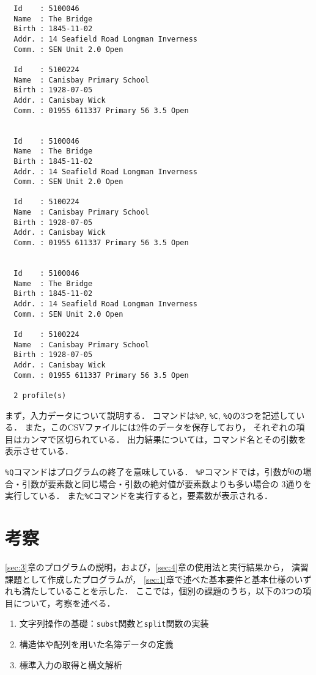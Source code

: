 \documentclass[autodetect-engine,dvi=dvipdfmx,ja=standard,
               a4j,11pt]{bxjsarticle}
\begin{document}
{\fontsize{10pt}{11pt} \selectfont
 \begin{verbatim}
  Id    : 5100046
  Name  : The Bridge
  Birth : 1845-11-02
  Addr. : 14 Seafield Road Longman Inverness
  Comm. : SEN Unit 2.0 Open

  Id    : 5100224
  Name  : Canisbay Primary School
  Birth : 1928-07-05
  Addr. : Canisbay Wick
  Comm. : 01955 611337 Primary 56 3.5 Open


  Id    : 5100046
  Name  : The Bridge
  Birth : 1845-11-02
  Addr. : 14 Seafield Road Longman Inverness
  Comm. : SEN Unit 2.0 Open

  Id    : 5100224
  Name  : Canisbay Primary School
  Birth : 1928-07-05
  Addr. : Canisbay Wick
  Comm. : 01955 611337 Primary 56 3.5 Open


  Id    : 5100046
  Name  : The Bridge
  Birth : 1845-11-02
  Addr. : 14 Seafield Road Longman Inverness
  Comm. : SEN Unit 2.0 Open

  Id    : 5100224
  Name  : Canisbay Primary School
  Birth : 1928-07-05
  Addr. : Canisbay Wick
  Comm. : 01955 611337 Primary 56 3.5 Open

  2 profile(s)
 \end{verbatim}
}

まず，入力データについて説明する．
コマンドは\verb|%P|, \verb|%C|, \verb|%Q|の3つを記述している．
また，このCSVファイルには2件のデータを保存しており，
それぞれの項目はカンマで区切られている．
出力結果については，コマンド名とその引数を表示させている．

\verb|%Q|コマンドはプログラムの終了を意味している．
\verb|%P|コマンドでは，引数が0の場合・引数が要素数と同じ場合・引数の絶対値が要素数よりも多い場合の
3通りを実行している．
また\verb|%C|コマンドを実行すると，要素数が表示される．


\section{考察} \label{sec:5}

\ref{sec:3}章のプログラムの説明，および，\ref{sec:4}章の使用法と実行結果から，
演習課題として作成したプログラムが，
\ref{sec:1}章で述べた基本要件と基本仕様のいずれも満たしていることを示した．
ここでは，個別の課題のうち，以下の3つの項目について，考察を述べる．

\begin{enumerate}
\setlength{\parskip}{2pt} \setlength{\itemsep}{2pt}
    \item 文字列操作の基礎：\texttt{subst}関数と\texttt{split}関数の実装
    \item 構造体や配列を用いた名簿データの定義
    \item 標準入力の取得と構文解析
\end{enumerate}
\end{document}

